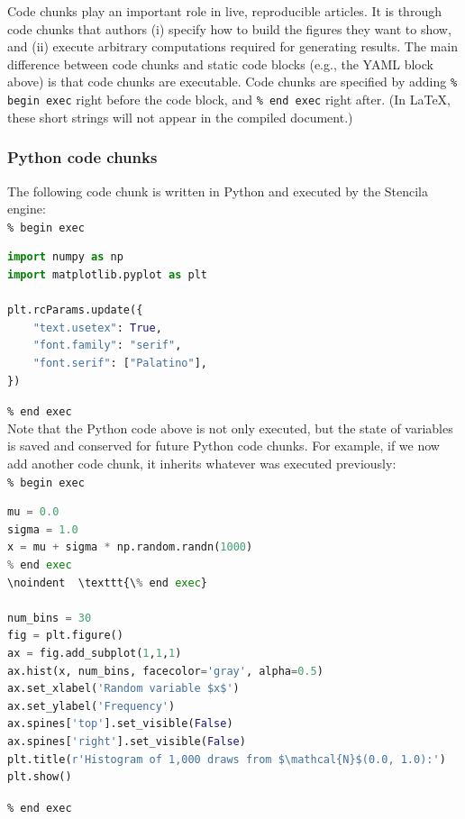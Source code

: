 \documentclass[12pt]{article}
\begin{document}
Code chunks play an important role in live, reproducible articles.
It is through code chunks that authors (i) specify how to build the
figures they want to show, and (ii) execute arbitrary computations
required for generating results.
The main difference between code chunks and static code blocks (e.g.,
the YAML block above) is that code chunks are executable.
Code chunks are specified by adding \texttt{\% begin exec} right
before the code block, and \texttt{\% end exec} right after.
(In \LaTeX, these short strings will not appear in the
compiled document.)

\subsubsection*{Python code chunks}

The following code chunk is written in Python and
executed by the Stencila engine:\\

\noindent \texttt{\% begin exec}
\begin{lstlisting}[language=Python, style=pythoncustomstyle,
  caption={Customizing some aspects of plotting before it is actually
    done.}]
import numpy as np
import matplotlib.pyplot as plt

plt.rcParams.update({
    "text.usetex": True,
    "font.family": "serif",
    "font.serif": ["Palatino"],
})
\end{lstlisting}
\noindent \texttt{\% end exec}\\

Note that the Python code above is not only executed, but the state of
variables is saved and conserved for future Python code chunks.
For example, if we now add another code chunk, it inherits whatever
was executed previously:\\

\noindent \texttt{\% begin exec}
\begin{lstlisting}[language=Python, style=pythoncustomstyle,
  caption={Histogram of 1,000 random draws from $\mathcal{N}$(0.0, 1.0).}]
mu = 0.0
sigma = 1.0
x = mu + sigma * np.random.randn(1000)
% end exec
\noindent  \texttt{\% end exec}

num_bins = 30
fig = plt.figure()
ax = fig.add_subplot(1,1,1)
ax.hist(x, num_bins, facecolor='gray', alpha=0.5)
ax.set_xlabel('Random variable $x$')
ax.set_ylabel('Frequency')
ax.spines['top'].set_visible(False)
ax.spines['right'].set_visible(False)
plt.title(r'Histogram of 1,000 draws from $\mathcal{N}$(0.0, 1.0):')
plt.show()
\end{lstlisting}
\noindent \texttt{\% end exec}\\
\end{document}
